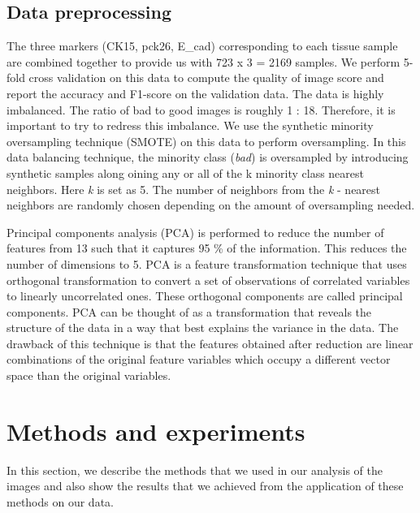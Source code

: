 \subsection{Data preprocessing}
The three markers (CK15, pck26, E\_cad) corresponding to each tissue sample are combined together to provide us with 723 x 3 = 2169 samples. We perform 5-fold cross validation on this data to compute the quality of image score and report the accuracy and F1-score on the validation data.
The data is highly imbalanced. The ratio of bad to good images is roughly 1 : 18. Therefore, it is important to try to redress this imbalance. We use the synthetic minority oversampling technique (SMOTE) \cite{chawla2002smote} on this data to perform oversampling.  In this data balancing technique, the minority class (\textit{bad}) is oversampled by introducing synthetic samples along oining any or all of the k minority class nearest neighbors. Here \textit{k} is set as 5. The number of neighbors from the \textit{k} - nearest neighbors are randomly chosen depending on the amount of oversampling needed.

Principal components analysis (PCA) \cite{wold1987principal} is performed to reduce the number of features from 13 such that it captures 95 \% of the information. This reduces the number of dimensions to 5.
PCA is a feature transformation technique that uses orthogonal transformation to convert a set of observations of correlated variables to linearly uncorrelated ones. These orthogonal components are called principal components. PCA can be thought of as a transformation that reveals the structure of the data in a way that best explains the variance in the data. The drawback of this technique is that the features obtained after reduction are linear combinations of the original feature variables which occupy a different vector space than the original variables. 


\section{Methods and experiments}
In this section, we describe the methods that we used in our analysis of the images and also show the results that we achieved from the application of these methods on our data.


